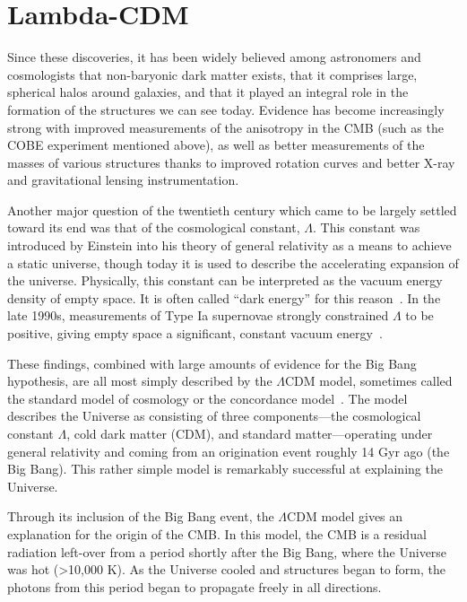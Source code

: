 \hypertarget{lambda-cdm-1}{%
\section{Lambda-CDM}\label{lambda-cdm-1}}

Since these discoveries, it has been widely believed among astronomers and
cosmologists that non-baryonic dark matter exists, that it comprises large,
spherical halos around galaxies, and that it played an integral role in the
formation of the structures we can see today. Evidence has become increasingly
strong with improved measurements of the anisotropy in the CMB (such as the COBE
experiment mentioned above), as well as better measurements of the masses of
various structures thanks to improved rotation curves and better X-ray and
gravitational lensing instrumentation.

Another major question of the twentieth century which came to be largely
settled toward its end was that of the cosmological constant, \(\Lambda\).
This constant was introduced by Einstein into his theory of general relativity
as a means to achieve a static universe, though today it is used to describe the
accelerating expansion of the universe.  Physically, this constant can be
interpreted as the vacuum energy density of empty space.  It is often called
``dark energy'' for this reason~\cite{schneider_extragalactic_2015}.  In the
late 1990s, measurements of Type Ia supernovae strongly constrained
\(\Lambda\) to be positive, giving empty space a significant, constant vacuum
energy~\cite{riess_observational_1998,perlmutter_measurements_1999}.

These findings, combined with large amounts of evidence for the Big Bang
hypothesis, are all most simply described by the \(\Lambda\)CDM model,
sometimes called the standard model of cosmology or the concordance model~\cite{dodelson_modern_2021}. The model describes the Universe as consisting
of three components---the cosmological constant \(\Lambda\), cold dark matter
(CDM), and standard matter---operating under general relativity and coming
from an origination event roughly 14 Gyr ago (the Big Bang). This rather
simple model is remarkably successful at explaining the Universe.

Through its inclusion of the Big Bang event, the \(\Lambda\)CDM model gives an
explanation for the origin of the CMB. In this model, the CMB is a residual
radiation left-over from a period shortly after the Big Bang, where the
Universe was hot (\textgreater{}10,000 K). As the Universe cooled and
structures began to form, the photons from this period began to propagate
freely in all directions.


